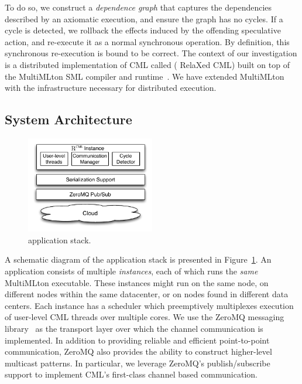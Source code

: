 To do so, we construct a \emph{dependence graph} that captures the dependencies
described by an axiomatic execution, and ensure the graph has no cycles. If a
cycle is detected, we rollback the effects induced by the offending speculative
action, and re-execute it as a normal synchronous operation. By definition,
this synchronous re-execution is bound to be correct. The context of our
investigation is a distributed implementation of CML called \rxcml ({\sc
RelaXed CML}) built on top of the MultiMLton SML compiler and
runtime~\cite{JFP14}. We have extended MultiMLton with the infrastructure
necessary for distributed execution.

\subsection {System Architecture}

\begin{figure}[t]
\centering
\includegraphics[width=0.5\textwidth]{Figures/CRexDesign}
\caption{\rxcml application stack.}
\label{fig:c-rex}
\end{figure}

A schematic diagram of the \rxcml application stack is presented in
Figure~\ref{fig:c-rex}. An \rxcml application consists of multiple
\emph{instances}, each of which runs the \emph{same} MultiMLton executable.
These instances might run on the same node, on different nodes within the same
datacenter, or on nodes found in different data centers. Each instance has a
scheduler which preemptively multiplexes execution of user-level CML threads
over multiple cores. We use the ZeroMQ messaging library~\cite{zeromq} as the
transport layer over which the \rxcml channel communication is implemented. In
addition to providing reliable and efficient point-to-point communication,
ZeroMQ also provides the ability to construct higher-level multicast patterns.
In particular, we leverage ZeroMQ's publish/subscribe support to implement
CML's first-class channel based communication.

